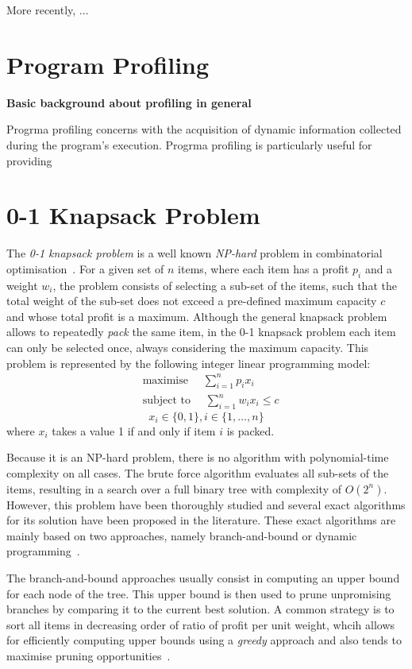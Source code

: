 More recently, \cite{ogilvie17}...

\section{Program Profiling}

\textbf{Basic background about profiling in general}

Progrma profiling concerns with the acquisition of dynamic information collected during the program's execution.
Progrma profiling is particularly useful for providing 

\section{0-1 Knapsack Problem}

The \textit{0-1 knapsack problem} is a well known \textit{NP-hard} problem in combinatorial optimisation~\cite{martello00}.
For a given set of $n$ items, where each item has a profit $p_i$ and a weight $w_i$, the problem consists of selecting a sub-set of the items, such that the total weight of the sub-set does not exceed a pre-defined maximum capacity $c$ and whose total profit is a maximum.
Although the general knapsack problem allows to repeatedly \textit{pack} the same item, in the 0-1 knapsack problem each item can only be selected once, always considering the maximum capacity.
This problem is represented by the following integer linear programming model:
\begin{equation*}
\begin{aligned}
& \textrm{maximise }\quad \sum_{i=1}^{n} p_ix_i \\
& \textrm{subject to }\quad \sum_{i=1}^{n} w_ix_i \leq c
\end{aligned}
\end{equation*}
\[
x_i\in\{0,1\}, i\in\{1,\ldots,n\}
\]
where $x_i$ takes a value 1 if and only if item $i$ is packed.

Because it is an NP-hard problem, there is no algorithm with polynomial-time complexity on all cases.
The brute force algorithm evaluates all sub-sets of the items, resulting in a search over a full binary tree with complexity of $O(2^n)$.
However, this problem have been thoroughly studied and several exact algorithms for its solution have been proposed in the literature.
These exact algorithms are mainly based on two approaches, namely branch-and-bound or dynamic programming~\citep{martello77,martello99}.

The branch-and-bound approaches usually consist in computing an upper bound for each node of the tree.
This upper bound is then used to prune unpromising branches by comparing it to the current best solution.
A common strategy is to sort all items in decreasing order of ratio of profit per unit weight, whcih allows for efficiently computing upper bounds using a \textit{greedy} approach and also tends to maximise pruning opportunities~\citep{martello77,martello00}.

